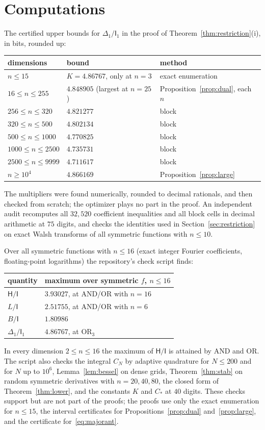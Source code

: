 \documentclass[11pt]{amsart}
\theoremstyle{definition}
\theoremstyle{remark}
\newcommand{\HH}{\mathsf H}
\newcommand{\I}{\mathsf I}
\begin{document}
\section{Computations}\label{sec:computations}

The certified upper bounds for $\Delta_1/\I_1$ in the proof of Theorem~\ref{thm:restriction}(i), in bits, rounded up:
\begin{center}
\begin{tabular}{@{}lll@{}}
\toprule
dimensions & bound & method\\
\midrule
$n\le15$ & $K=4.86767$, only at $n=3$ & exact enumeration\\
$16\le n\le255$ & $4.848905$ (largest at $n=25$) & Proposition~\ref{prop:dual}, each $n$\\
$256\le n\le320$ & $4.821277$ & block\\
$320\le n\le500$ & $4.802134$ & block\\
$500\le n\le1000$ & $4.770825$ & block\\
$1000\le n\le2500$ & $4.735731$ & block\\
$2500\le n\le9999$ & $4.711617$ & block\\
$n\ge10^4$ & $4.866169$ & Proposition~\ref{prop:large}\\
\bottomrule
\end{tabular}
\end{center}
The multipliers were found numerically, rounded to decimal rationals, and then checked from scratch; the optimizer plays no part in the proof. An independent audit recomputes all $32{,}520$ coefficient inequalities and all block cells in decimal arithmetic at $75$ digits, and checks the identities used in Section~\ref{sec:restriction} on exact Walsh transforms of all symmetric functions with $n\le10$.

Over all symmetric functions with $n\le16$ (exact integer Fourier coefficients, floating-point logarithms) the repository's check script finds:
\begin{center}
\begin{tabular}{@{}ll@{}}
\toprule
quantity & maximum over symmetric $f$, $n\le16$\\
\midrule
$\HH/\I$ & $3.93027$, at AND/OR with $n=16$ \\
$L/\I$ & $2.51755$, at AND/OR with $n=6$ \\
$B/\I$ & $1.80986$ \\
$\Delta_1/\I_1$ & $4.86767$, at $\mathrm{OR}_3$ \\
\bottomrule
\end{tabular}
\end{center}
In every dimension $2\le n\le16$ the maximum of $\HH/\I$ is attained by AND and OR. The script also checks the integral $C_N$ by adaptive quadrature for $N\le200$ and for $N$ up to $10^6$, Lemma~\ref{lem:bessel} on dense grids, Theorem~\ref{thm:stab} on random symmetric derivatives with $n=20,40,80$, the closed form of Theorem~\ref{thm:lower}, and the constants $K$ and $C_*$ at $40$ digits. These checks support but are not part of the proofs; the proofs use only the exact enumeration for $n\le15$, the interval certificates for Propositions~\ref{prop:dual} and~\ref{prop:large}, and the certificate for~\eqref{eq:majorant}.
\end{document}
